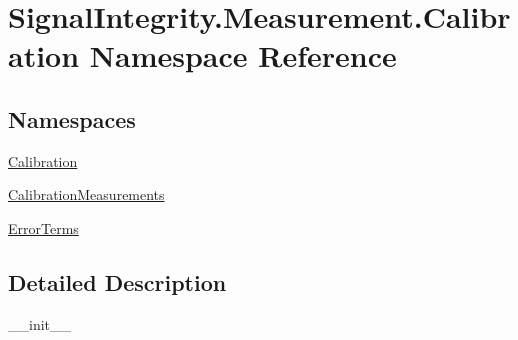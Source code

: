 \hypertarget{namespaceSignalIntegrity_1_1Measurement_1_1Calibration}{}\section{Signal\+Integrity.\+Measurement.\+Calibration Namespace Reference}
\label{namespaceSignalIntegrity_1_1Measurement_1_1Calibration}
\subsection*{Namespaces}
\begin{DoxyCompactItemize}
\item 
 \hyperlink{namespaceSignalIntegrity_1_1Measurement_1_1Calibration_1_1Calibration}{Calibration}
\item 
 \hyperlink{namespaceSignalIntegrity_1_1Measurement_1_1Calibration_1_1CalibrationMeasurements}{Calibration\+Measurements}
\item 
 \hyperlink{namespaceSignalIntegrity_1_1Measurement_1_1Calibration_1_1ErrorTerms}{Error\+Terms}
\end{DoxyCompactItemize}


\subsection{Detailed Description}
\begin{DoxyVerb}__init__\end{DoxyVerb}
 